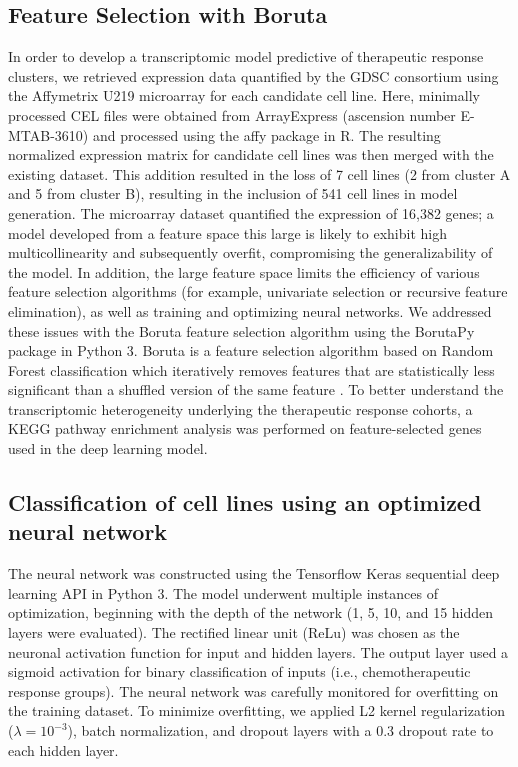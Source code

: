 \documentclass[10pt, letterpaper, twocolumn]{article}
\begin{document}
\subsection{Feature Selection with Boruta}
In order to develop a transcriptomic model predictive of therapeutic response clusters, we retrieved expression data quantified by the GDSC consortium using the Affymetrix U219 microarray for each candidate cell line. Here, minimally processed CEL files were obtained from ArrayExpress (ascension number E-MTAB-3610) and processed using the affy package \cite{affy} in R. The resulting normalized expression matrix for candidate cell lines was then merged with the existing dataset. This addition resulted in the loss of 7 cell lines (2 from cluster A and 5 from cluster B), resulting in the inclusion of 541 cell lines in model generation. The microarray dataset quantified the expression of 16,382 genes; a model developed from a feature space this large is likely to exhibit high multicollinearity and subsequently overfit, compromising the generalizability of the model. In addition, the large feature space limits the efficiency of various feature selection algorithms (for example, univariate selection or recursive feature elimination), as well as training and optimizing neural networks. We addressed these issues with the Boruta feature selection algorithm using the BorutaPy package \cite{liu} in Python 3. Boruta is a feature selection algorithm based on Random Forest classification which iteratively removes features that are statistically less significant than a shuffled version of the same feature \cite{kursa}. To better understand the transcriptomic heterogeneity underlying the therapeutic response cohorts, a KEGG pathway enrichment analysis was performed on feature-selected genes used in the deep learning model.


\subsection{Classification of cell lines using an optimized neural network}
The neural network was constructed using the Tensorflow Keras sequential deep learning API \cite{keras} in Python 3. The model underwent multiple instances of optimization, beginning with the depth of the network (1, 5, 10, and 15 hidden layers were evaluated). The rectified linear unit (ReLu) was chosen as the neuronal activation function for input and hidden layers. The output layer used a sigmoid activation for binary classification of inputs (i.e., chemotherapeutic response groups). The neural network was carefully monitored for overfitting on the training dataset. To minimize overfitting, we applied L2 kernel regularization ($\lambda=10^{-3}$), batch normalization, and dropout layers with a 0.3 dropout rate to each hidden layer.
\end{document}
